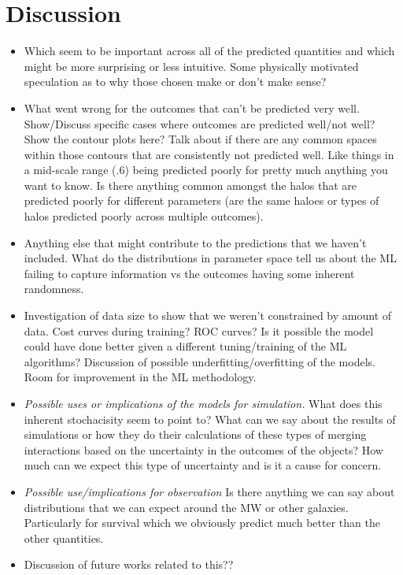 \documentclass[fleqn,usenatbib]{mnras}
\begin{document}
\section{Discussion}
\begin{itemize}
	\item {} Which seem to be important across all of the predicted quantities and which might be more surprising or less intuitive. Some physically motivated speculation as to why those chosen make or don't make sense?
    \item What went wrong for the outcomes that can't be predicted very well. Show/Discuss specific cases where outcomes are predicted well/not well? Show the contour plots here? Talk about if there are any common spaces within those contours that are consistently not predicted well. Like things in a mid-scale range (.6) being predicted poorly for pretty much anything you want to know. Is there anything common amongst the halos that are predicted poorly for different parameters (are the same haloes or types of halos predicted poorly across multiple outcomes).
    \item {} Anything else that might contribute to the predictions that we haven't included. What do the distributions in parameter space tell us about the ML failing to capture information vs the outcomes having some inherent randomness.
    \item {} Investigation of data size to show that we weren't constrained by amount of data. Cost curves during training? ROC curves? Is it possible the model could have done better given a different tuning/training of the ML algorithms? Discussion of possible underfitting/overfitting of the models. Room for improvement in the ML methodology.
    \item \textit{Possible uses or implications of the models for simulation.} What does this inherent stochacisity seem to point to? What can we say about the results of simulations or how they do their calculations of these types of merging interactions based on the uncertainty in the outcomes of the objects? How much can we expect this type of uncertainty and is it a cause for concern.
    \item \textit{Possible use/implications for observation} Is there anything we can say about distributions that we can expect around the MW or other galaxies. Particularly for survival which we obviously predict much better than the other quantities.
    \item Discussion of future works related to this??

\end{itemize}
\end{document}
